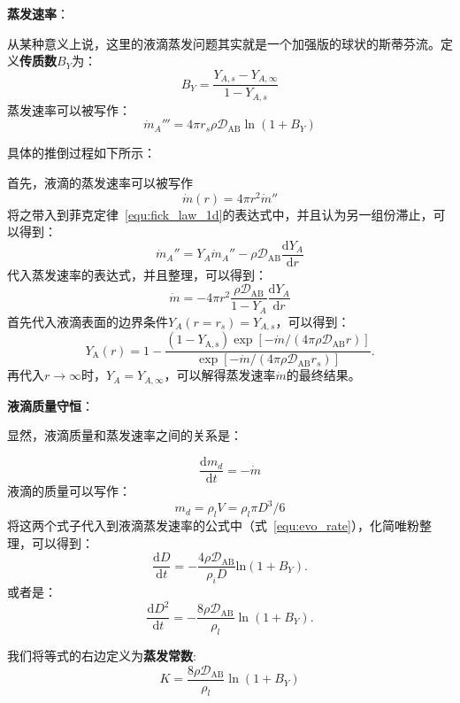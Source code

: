 \documentclass[8pt,landscape]{article}
\newcommand{\dd}{\mathrm{d}}
\begin{document}
\begin{multicols}{3}
\textbf{蒸发速率}：

从某种意义上说，这里的液滴蒸发问题其实就是一个加强版的球状的斯蒂芬流。定义\textbf{传质数}\(B_Y\)为：
\begin{equation}
    B_Y = \frac{Y_{A,s}-Y_{A,\infty}}{1 - Y_{A,s}}
\end{equation}
蒸发速率可以被写作：
\begin{equation}\label{equ:evo_rate}
    \dot{m}_A''' = {4\pi r_s \rho \mathcal{D}_\mathrm{AB}}\ln({1+B_Y})
\end{equation}

具体的推倒过程如下所示：

{
    \scriptsize\color{gray}
    首先，液滴的蒸发速率可以被写作
    \[
        \dot{m}(r) = 4\pi r^2 \dot{m}''
    \]
    将之带入到菲克定律~\ref{equ:fick_law_1d}的表达式中，并且认为另一组份滞止，可以得到：
    \[
        \dot{m}_A'' = Y_A\dot{m}_A'' - \rho\mathcal{D}_\mathrm{AB}\frac{\dd Y_A}{\dd r}
    \]
    代入蒸发速率的表达式，并且整理，可以得到：
    \[
        \dot{m}=-4\pi r^2 \frac{\rho \mathcal{D}_\mathrm{AB}}{1-Y_A}\frac{\dd Y_A}{\dd r}
    \]
    首先代入液滴表面的边界条件\(Y_A(r=r_s)=Y_{A,s}\)，可以得到：
    \[
        Y_{\mathrm{A}}(r)=1-{\frac{(1-Y_{\mathrm{A,s}})\exp[-\dot{m}/(4\pi\rho \mathcal{D}_{\mathrm{AB}}r)]}{\exp[-\dot{m}/(4\pi\rho \mathcal{D}_{\mathrm{AB}}r_{s})]}}.
    \]
    再代入\(r\to\infty\)时，\(Y_A=Y_{A,\infty}\)，可以解得蒸发速率\(\dot{m}\)的最终结果。
}

\textbf{液滴质量守恒}：

显然，液滴质量和蒸发速率之间的关系是：

\begin{equation}
    \frac{\dd m_d}{\dd t}=-\dot{m}
\end{equation}
液滴的质量可以写作：
\begin{equation}
    m_d = \rho_l V = \rho_l \pi D^3/6
\end{equation}
将这两个式子代入到液滴蒸发速率的公式中（式~\ref{equ:evo_rate}），化简唯粉整理，可以得到：
\begin{equation}
    \frac{\mathrm{d}D}{\mathrm{d}t}=-\frac{4\rho \mathcal{D}_\mathrm{AB}}{\rho_{i}D}\mathrm{ln}(1+B_{Y}).
\end{equation}
或者是：
\begin{equation}
    {\frac{\mathrm{d}D^{2}}{\mathrm{d}t}}=-{\frac{8\rho \mathcal{D}_{\mathrm{AB}}}{\rho_{l}}}\ln(1+B_{Y}).
\end{equation}

我们将等式的右边定义为\textbf{蒸发常数}:
\begin{equation}
    K = {\frac{8\rho \mathcal{D}_{\mathrm{AB}}}{\rho_{l}}}\ln(1+B_{Y})
\end{equation}


\end{multicols}
\end{document}
